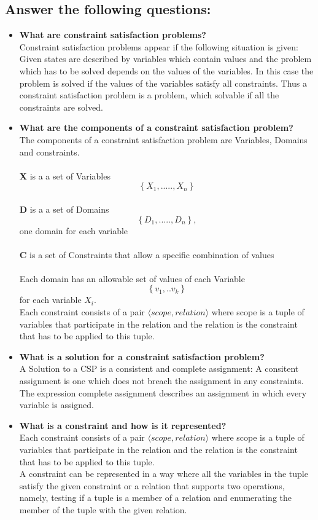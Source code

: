 \documentclass[11pt]{article}
\begin{document}
\subsection{Answer the following questions:}
	\begin{itemize}
		\item\textbf{What are constraint satisfaction problems?}\\
		Constraint satisfaction problems appear if the following situation is given: Given states are described by variables which contain values and the problem which has to be solved depends on the values of the variables. In this case the problem is solved if the values of the variables satisfy all constraints. Thus a constraint satisfaction problem is a problem, which solvable if all the constraints are solved.
		
		\item\textbf{What are the components of a constraint satisfaction problem?}\\
		The components of a constraint satisfaction problem are Variables, Domains and constraints. \\\\
		\textbf X is a a set of Variables $$\left\{X_1,.....,X_n\right\}$$\\
		\textbf D is a a set of Domains $$\left\{D_1,.....,D_n\right\},$$ one domain for each variable\\\\
		\textbf C is a set of Constraints that allow a specific combination of values\\\\
		Each domain has an allowable set of values of each Variable $$\left\{v_1,..v_k\right\}$$ for each variable $X_i$.\\
		Each constraint consists of a pair $\langle scope, relation \rangle$ where scope is a tuple of variables that participate in the relation and the relation is the constraint that has to be applied to this tuple.
		
		\item\textbf{What is a solution for a constraint satisfaction problem?}\\
		A Solution to a CSP is a consistent and complete assignment: A consitent assignment is one which does not breach the assignment in any constraints. The expression complete assignment describes an assignment in which every variable is assigned.
		
		\item\textbf{What is a constraint and how is it represented?}\\
		Each constraint consists of a pair $\langle scope, relation \rangle$ where scope is a tuple of variables that participate in the relation and the relation is the constraint that has to be applied to this tuple.\\ A constraint can be represented in a way where all the variables in the tuple satisfy the given constraint or a relation that supports two operations, namely, testing if a tuple is a member of a relation and enumerating the member of the tuple with the given relation.
		

\end{itemize}
\end{document}

